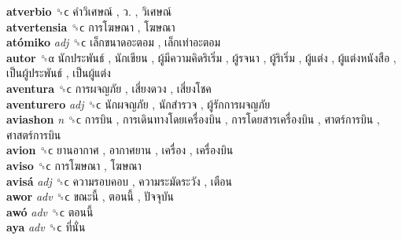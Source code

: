 \textbf{atverbio} ␝ϲ   คำวิเศษณ์ ,  ว. ,  วิเศษณ์   \\
\textbf{atvertensia} ␝ϲ   การโฆษณา ,  โฆษณา   \\
\textbf{atómiko} \emph{adj}  ␝ϲ   เล็กขนาดอะตอม ,  เล็กเท่าอะตอม   \\
\textbf{autor} ␝α   นักประพันธ์ ,  นักเขียน ,  ผู้มีความคิดริเริ่ม ,  ผู้รจนา ,  ผู้ริเริ่ม ,  ผู้แต่ง ,  ผู้แต่งหนังสือ ,  เป็นผู้ประพันธ์ ,  เป็นผู้แต่ง   \\
\textbf{aventura} ␝ϲ   การผจญภัย ,  เสี่ยงดวง ,  เสี่ยงโชค   \\
\textbf{aventurero} \emph{adj}  ␝ϲ   นักผจญภัย ,  นักสำรวจ ,  ผู้รักการผจญภัย   \\
\textbf{aviashon} \emph{n}  ␝ϲ   การบิน ,  การเดินทางโดยเครื่องบิน ,  การโดยสารเครื่องบิน ,  ศาตร์การบิน ,  ศาสตร์การบิน   \\
\textbf{avion} ␝ϲ   ยานอากาศ ,  อากาศยาน ,  เครื่อง ,  เครื่องบิน   \\
\textbf{aviso} ␝ϲ   การโฆษณา ,  โฆษณา   \\
\textbf{avisá} \emph{adj}  ␝ϲ   ความรอบคอบ ,  ความระมัดระวัง ,  เตือน   \\
\textbf{awor} \emph{adv}  ␝ϲ   ขณะนี้ ,  ตอนนี้ ,  ปัจจุบัน   \\
\textbf{awó} \emph{adv}  ␝ϲ   ตอนนี้   \\
\textbf{aya} \emph{adv}  ␝ϲ   ที่นั่น   \\
